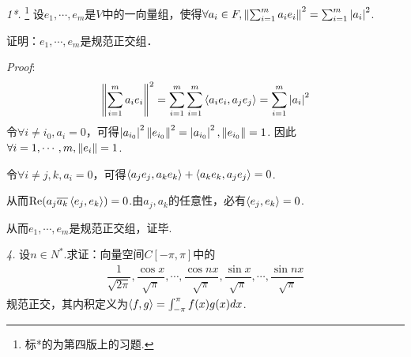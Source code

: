 \newpage

\textit{1*.} \footnote{标*的为第四版上的习题.}
设\(e_1,\cdots,e_m\)是\(V\)中的一向量组，使得\(\forall a_i \in F,\left\lVert \sum_{i=1}^m a_ie_i \right\rVert^2=\sum_{i=1}^m \left\lvert a_i \right\rvert^2\).

证明：\(e_1,\cdots,e_m\)是规范正交组．

\textit{Proof}:
    \begin{align*}
        \left\lVert \sum_{i=1}^m a_ie_i \right\rVert^2=\sum_{i=1}^m \sum_{i=1}^m \left\langle a_ie_i,a_je_j \right\rangle=\sum_{i=1}^m \left\lvert a_i \right\rvert^2
    \end{align*}
令\(\forall i \ne i_0,a_i=0\)，可得\(\left\lvert a_{i_0} \right\rvert^2\left\lVert e_{i_0} \right\rVert^2=\left\lvert a_{i_0} \right\rvert^2,\left\lVert e_{i_0} \right\rVert=1\).
因此\(\forall i=1,\cdots,m,\left\lVert e_i \right\rVert=1\).

令\(\forall i \ne j,k,a_i=0\)，可得\(\left\langle a_je_j,a_ke_k \right\rangle+\left\langle a_ke_k,a_je_j \right\rangle=0\).

从而\(\mathrm{Re}(a_j\overline{a_k}\left\langle e_j,e_k \right\rangle)=0\).由\(a_j,a_k\)的任意性，必有\(\left\langle e_j,e_k \right\rangle=0\).

从而\(e_1,\cdots,e_m\)是规范正交组，证毕.

\hspace*{\fill}

\textit{4.}
设\(n \in N^*\).求证：向量空间\(C[-\pi,\pi]\)中的
    \begin{align*}
        \dfrac{1}{\sqrt{2\pi}},\dfrac{\cos x}{\sqrt{\pi}},\cdots,\dfrac{\cos nx}{\sqrt{\pi}},
        \dfrac{\sin x}{\sqrt{\pi}},\cdots,\dfrac{\sin nx}{\sqrt{\pi}}
    \end{align*}
规范正交，其内积定义为\(\left\langle f,g \right\rangle=\int_{-\pi}^{\pi}f(x)g(x)dx\).

